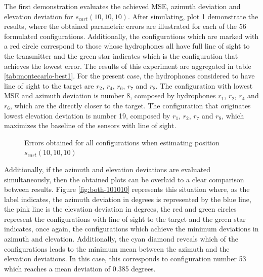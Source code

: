 The first demonstration evaluates the achieved MSE, azimuth deviation and elevation deviation for $s_{cart}(10,10,10)$. After simulating, plot \ref{fig:errors-101010} demonstrate the results, where the obtained parametric errors are illustrated for each of the 56 formulated configurations. Additionally, the configurations which are marked with a red circle correspond to those whose hydrophones all have full line of sight to the transmitter and the green star indicates which is the configuration that achieves the lowest error. The results of this experiment are aggregated in table \ref{tab:montecarlo-best1}. For the present case, the hydrophones considered to have line of sight to the target are $r_2$, $r_4$, $r_6$, $r_7$ and $r_8$. The configuration with lowest MSE and azimuth deviation is number 8, composed by hydrophones $r_1$, $r_2$, $r_4$ and $r_6$, which are the directly closer to the target. The configuration that originates lowest elevation deviation is number 19, composed by $r_1$, $r_2$, $r_7$ and $r_8$, which maximizes the baseline of the sensors with line of sight.

\begin{figure}[!htbp]
	\captionsetup{justification=centering,margin=2cm}
	\caption{Errors obtained for all configurations when estimating position $s_{cart}(10,10,10)$}
	\label{fig:errors-101010}
\end{figure}

Additionally, if the azimuth and elevation deviations are evaluated simultaneously, then the obtained plots can be overlaid to a clear comparison between results. Figure \ref{fig:both-101010} represents this situation where, as the label indicates, the azimuth deviation in degrees is represented by the blue line, the pink line is the elevation deviation in degrees, the red and green circles represent the configurations with line of sight to the target and the green star indicates, once again, the configurations which achieve the minimum deviations in azimuth and elevation. Additionally, the cyan diamond reveals which of the configurations leads to the minimum mean between the azimuth and the elevation deviations. In this case, this corresponds to configuration number 53 which reaches a mean deviation of 0.385 degrees. 

